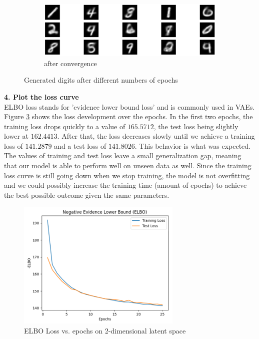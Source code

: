 \begin{figure}[H]\ContinuedFloat
    \centering
    \begin{subfigure}[b]{\textwidth}
        \centering
        \includegraphics[width=\textwidth]{images/3-generatedCon.png}
        \caption{after convergence}
        \label{fig:generatedCon}
    \end{subfigure}
    \caption{Generated digits after different numbers of epochs}
    \label{fig:generated2}
\end{figure}

\textbf{4. Plot the loss curve} \\

ELBO loss stands for 'evidence lower bound loss' and is commonly used in VAEs. Figure \ref{fig:elbo} shows the loss development over the epochs. In the first two epochs, the training loss drops quickly to a value of $165.5712$, the test loss being slightly lower at $162.4413$. After that, the loss decreases slowly until we achieve a training loss of $141.2879$ and a test loss of $141.8026$. This behavior is what was expected. The values of training and test loss leave a small generalization gap, meaning that our model is able to perform well on unseen data as well. Since the training loss curve is still going down when we stop training, the model is not overfitting and we could possibly increase the training time (amount of epochs) to achieve the best possible outcome given the same parameters. \\ 

\begin{figure}[hbt!]
    \centering
    \includegraphics[width=0.7\textwidth]{images/3-ELBO.png}
    \caption{ELBO Loss vs. epochs on 2-dimensional latent space}
    \label{fig:elbo}
\end{figure}

